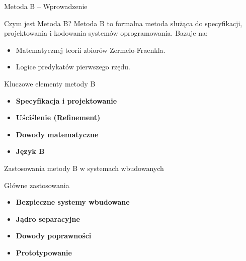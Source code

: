 \documentclass{beamer}
\begin{document}
\begin{frame}{Metoda B – Wprowadzenie}
  \begin{block}{Czym jest Metoda B?}
    Metoda B to formalna metoda służąca do specyfikacji, projektowania i kodowania systemów oprogramowania. Bazuje na:
    \begin{itemize}
      \item Matematycznej teorii zbiorów Zermelo-Fraenkla.
      \item Logice predykatów pierwszego rzędu.
    \end{itemize}
  \end{block}
  
  \begin{block}{Kluczowe elementy metody B}
  \begin{itemize}
    \item \textbf{Specyfikacja i projektowanie}
    \item \textbf{Uściślenie (Refinement)}
    \item \textbf{Dowody matematyczne}
    \item \textbf{Język B}
  \end{itemize}
  \end{block}
\end{frame}

\begin{frame}{Zastosowania metody B w systemach wbudowanych}
  \begin{block}{Główne zastosowania}
  \begin{itemize}
    \item \textbf{Bezpieczne systemy wbudowane}
    \item \textbf{Jądro separacyjne}
    \item \textbf{Dowody poprawności}
    \item \textbf{Prototypowanie}
  \end{itemize}
  \end{block}
\end{frame}
\end{document}
